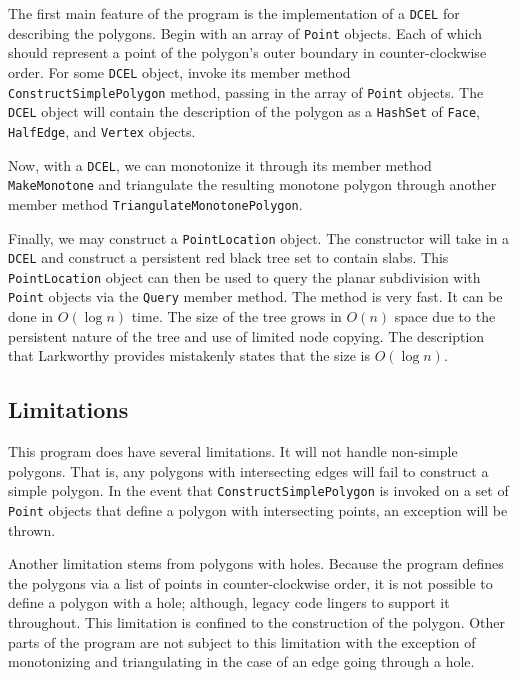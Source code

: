 \documentclass[11pt]{article}
\begin{document}
	The first main feature of the program is the implementation of a \texttt{DCEL} for describing the polygons. Begin with an array of \texttt{Point} objects. Each of which should represent a point of the polygon's outer boundary in counter-clockwise order. For some \texttt{DCEL} object, invoke its member method \texttt{ConstructSimplePolygon} method, passing in the array of \texttt{Point} objects. The \texttt{DCEL} object will contain the description of the polygon as a \texttt{HashSet} of \texttt{Face}, \texttt{HalfEdge}, and \texttt{Vertex} objects.
	
	Now, with a \texttt{DCEL}, we can monotonize it through its member method \texttt{MakeMonotone} and triangulate the resulting monotone polygon through another member method \texttt{TriangulateMonotonePolygon}.
	
	Finally, we may construct a \texttt{PointLocation} object. The constructor will take in a \texttt{DCEL} and construct a persistent red black tree set to contain slabs. This \texttt{PointLocation} object can then be used to query the planar subdivision with \texttt{Point} objects via the \texttt{Query} member method. The method is very fast. It can be done in $O\left( \log n \right)$ time. The size of the tree grows in $O\left( n \right)$ space due to the persistent nature of the tree and use of limited node copying. The description that Larkworthy provides mistakenly states that the size is $O\left( \log n \right)$.
	
\subsection{Limitations}
\label{sec:limitations}

	This program does have several limitations. It will not handle non-simple polygons. That is, any polygons with intersecting edges will fail to construct a simple polygon. In the event that \texttt{ConstructSimplePolygon} is invoked on a set of \texttt{Point} objects that define a polygon with intersecting points, an exception will be thrown.
	
	Another limitation stems from polygons with holes. Because the program defines the polygons via a list of points in counter-clockwise order, it is not possible to define a polygon with a hole; although, legacy code lingers to support it throughout. This limitation is confined to the construction of the polygon. Other parts of the program are not subject to this limitation with the exception of monotonizing and triangulating in the case of an edge going through a hole.
	
\end{document}

